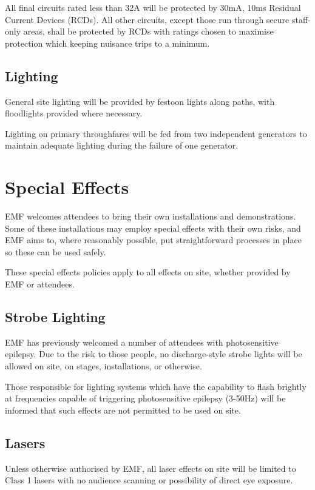 All final circuits rated less than 32A will be protected by 30mA, 10ms Residual
Current Devices (RCDs).  All other circuits, except those run through secure
staff-only areas, shall be protected by RCDs with ratings chosen to maximise
protection which keeping nuisance trips to a minimum.

\subsection{Lighting}
General site lighting will be provided by festoon lights along paths,
with floodlights provided where necessary.

Lighting on primary throughfares will be fed from two independent generators
to maintain adequate lighting during the failure of one generator.

\newpage

\section{Special Effects}
EMF welcomes attendees to bring their own installations and demonstrations.
Some of these installations may employ special effects with their own risks,
and EMF aims to, where reasonably possible, put straightforward processes in
place so these can be used safely. 

These special effects policies apply to all effects on site, whether provided
by EMF or attendees.

\subsection{Strobe Lighting}
EMF has previously welcomed a number of attendees with photosensitive epilepsy.
Due to the risk to those people, no discharge-style strobe lights will be allowed
on site, on stages, installations, or otherwise.

Those responsible for lighting systems which have the capability to flash brightly
at frequencies capable of triggering photosensitive epilepsy (3-50Hz) will be
informed that such effects are not permitted to be used on site.

\subsection{Lasers}\label{lasers}
Unless otherwise authorised by EMF, all laser effects on site will be limited to
Class 1 lasers with no audience scanning or possibility of direct eye exposure.

